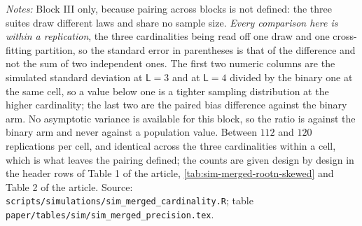 \documentclass[
  12pt]{article}
\newcommand{\1}[1]{\mathds{1}\left[#1\right]}
\theoremstyle{plain}
\theoremstyle{definition}
\theoremstyle{definition}
\theoremstyle{remark}
\begin{document}
\begin{table}[!htbp]
\centering
\begin{threeparttable}
\caption{The paired cardinality contrast, on the same draws}
\label{tab:sim-merged-precision}
\footnotesize

\begin{tablenotes}\footnotesize
\item \textit{Notes:} Block III only, because pairing across blocks is not
defined: the three suites draw different laws and share no sample size.
\emph{Every comparison here is within a replication}, the three cardinalities
being read off one draw and one cross-fitting partition, so the standard error in
parentheses is that of the difference and not the sum of two independent ones.
The first two numeric columns are the simulated standard deviation at
$\mathsf L=3$ and at $\mathsf L=4$ divided by the binary one at the same cell,
so a value below one is a tighter sampling distribution at the higher
cardinality; the last two are the paired bias difference against the binary arm.
No asymptotic variance is available for this block, so the ratio is against the
binary arm and never against a population value. Between $112$ and $120$
replications per cell, and identical across the three cardinalities within a
cell, which is what leaves the pairing defined; the counts are given design by
design in the header rows of Table 1 of the article,
\cref{tab:sim-merged-rootn-skewed} and Table 2 of the article.
Source: \texttt{scripts/simulations/sim\_merged\_cardinality.R}; table
\texttt{paper/tables/sim/sim\_merged\_precision.tex}.
\end{tablenotes}
\end{threeparttable}
\end{table}
\end{document}
